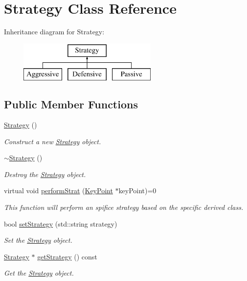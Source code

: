 \hypertarget{classStrategy}{}\section{Strategy Class Reference}
\label{classStrategy}
Inheritance diagram for Strategy\+:\begin{figure}[H]
\begin{center}
\leavevmode
\includegraphics[height=2.000000cm]{classStrategy}
\end{center}
\end{figure}
\subsection*{Public Member Functions}
\begin{DoxyCompactItemize}
\item 
\mbox{\label{classStrategy_a2021a15bbc4f0d13f7b92f8933db2235}} 
\hyperlink{classStrategy_a2021a15bbc4f0d13f7b92f8933db2235}{Strategy} ()
\begin{DoxyCompactList}\small\item\em Construct a new \hyperlink{classStrategy}{Strategy} object. \end{DoxyCompactList}\item 
\mbox{\label{classStrategy_a37c0bbdd64fd7dfcdd91578784a64775}} 
\hyperlink{classStrategy_a37c0bbdd64fd7dfcdd91578784a64775}{$\sim$\+Strategy} ()
\begin{DoxyCompactList}\small\item\em Destroy the \hyperlink{classStrategy}{Strategy} object. \end{DoxyCompactList}\item 
virtual void \hyperlink{classStrategy_ada170bd47bc6f11ac02d7df2b366387b}{perform\+Strat} (\hyperlink{classKeyPoint}{Key\+Point} $\ast$key\+Point)=0
\begin{DoxyCompactList}\small\item\em This function will perform an spifice strategy based on the specific derived class. \end{DoxyCompactList}\item 
bool \hyperlink{classStrategy_a35c4bbd2d37efaf24e21b7a0e82b4c96}{set\+Strategy} (std\+::string strategy)
\begin{DoxyCompactList}\small\item\em Set the \hyperlink{classStrategy}{Strategy} object. \end{DoxyCompactList}\item 
\hyperlink{classStrategy}{Strategy} $\ast$ \hyperlink{classStrategy_a4e5f4c986d744911085fcf67acbada22}{get\+Strategy} () const
\begin{DoxyCompactList}\small\item\em Get the \hyperlink{classStrategy}{Strategy} object. \end{DoxyCompactList}\end{DoxyCompactItemize}
